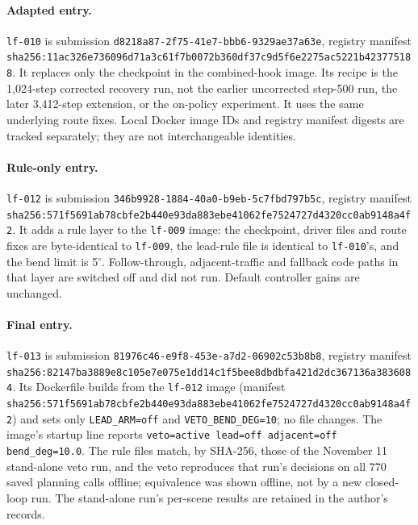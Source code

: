 \documentclass{article}
\newcommand{\lf}{\texttt{lf-009}}
\begin{document}
\paragraph{Adapted entry.}
\texttt{lf-010} is submission \nolinkurl{d8218a87-2f75-41e7-bbb6-9329ae37a63e}, registry manifest \nolinkurl{sha256:11ac326e736096d71a3c61f7b0072b360df37c9d5f6e2275ac5221b423775188}. It replaces only the checkpoint in the combined-hook image. Its recipe is the 1,024-step corrected recovery run, not the earlier uncorrected step-500 run, the later 3,412-step extension, or the on-policy experiment. It uses the same underlying route fixes. Local Docker image IDs and registry manifest digests are tracked separately; they are not interchangeable identities.

\paragraph{Rule-only entry.}
\texttt{lf-012} is submission \nolinkurl{346b9928-1884-40a0-b9eb-5c7fbd797b5c}, registry manifest \nolinkurl{sha256:571f5691ab78cbfe2b440e93da883ebe41062fe7524727d4320cc0ab9148a4f2}. It adds a rule layer to the \lf{} image: the checkpoint, driver files and route fixes are byte-identical to \lf{}, the lead-rule file is identical to \texttt{lf-010}'s, and the bend limit is 5$^\circ$. Follow-through, adjacent-traffic and fallback code paths in that layer are switched off and did not run. Default controller gains are unchanged.

\paragraph{Final entry.}
\texttt{lf-013} is submission \nolinkurl{81976c46-e9f8-453e-a7d2-06902c53b8b8}, registry manifest \nolinkurl{sha256:82147ba3889e8c105e7e075e1dd14c1f5bee8dbdbfa421d2dc367136a3836084}. Its Dockerfile builds from the \texttt{lf-012} image (manifest \nolinkurl{sha256:571f5691ab78cbfe2b440e93da883ebe41062fe7524727d4320cc0ab9148a4f2}) and sets only \texttt{LEAD\_ARM=off} and \texttt{VETO\_BEND\_DEG=10}; no file changes. The image's startup line reports \texttt{veto=active lead=off adjacent=off bend\_deg=10.0}. The rule files match, by SHA-256, those of the November 11 stand-alone veto run, and the veto reproduces that run's decisions on all 770 saved planning calls offline; equivalence was shown offline, not by a new closed-loop run. The stand-alone run's per-scene results are retained in the author's records.
\end{document}
